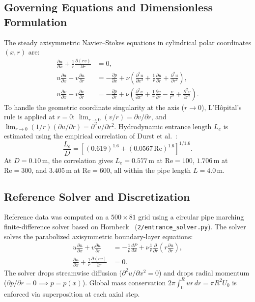 \documentclass[11pt,a4paper]{article}
\begin{document}
\subsection{Governing Equations and Dimensionless Formulation}
The steady axisymmetric Navier--Stokes equations in cylindrical polar coordinates $(x, r)$ are:
\begin{align}
\frac{\partial u}{\partial x} + \frac{1}{r} \frac{\partial (r v)}{\partial r} &= 0, \\
u \frac{\partial u}{\partial x} + v \frac{\partial u}{\partial r} &= -\frac{\partial p}{\partial x} + \nu \left(\frac{\partial^2 u}{\partial x^2} + \frac{1}{r} \frac{\partial u}{\partial r} + \frac{\partial^2 u}{\partial r^2}\right), \\
u \frac{\partial v}{\partial x} + v \frac{\partial v}{\partial r} &= -\frac{\partial p}{\partial r} + \nu \left(\frac{\partial^2 v}{\partial x^2} + \frac{1}{r} \frac{\partial v}{\partial r} - \frac{v}{r^2} + \frac{\partial^2 v}{\partial r^2}\right).
\end{align}
To handle the geometric coordinate singularity at the axis ($r \to 0$), L'H\^opital's rule is applied at $r = 0$: $\lim_{r\to 0} (v/r) = \partial v/\partial r$, and $\lim_{r\to 0} (1/r)(\partial u/\partial r) = \partial^2 u/\partial r^2$.
Hydrodynamic entrance length $L_e$ is estimated using the empirical correlation of Durst et al.~\cite[Eq.~(2a), p.~8]{ray2017}:
\begin{equation}
\frac{L_e}{D} = \left[(0.619)^{1.6} + (0.0567\,\mathrm{Re})^{1.6}\right]^{1/1.6}.
\end{equation}
At $D = 0.10\,\text{m}$, the correlation gives $L_e = 0.577\,\text{m}$ at $\mathrm{Re}=100$, $1.706\,\text{m}$ at $\mathrm{Re}=300$, and $3.405\,\text{m}$ at $\mathrm{Re}=600$, all within the pipe length $L = 4.0\,\text{m}$.

\subsection{Reference Solver and Discretization}
Reference data was computed on a $500 \times 81$ grid using a circular pipe marching finite-difference solver based on Hornbeck~\cite[Ch.~7, pp.~195--202]{hornbeck1973} (\texttt{2/entrance\_solver.py}).
The solver solves the parabolized axisymmetric boundary-layer equations:
\begin{align}
u \frac{\partial u}{\partial x} + v \frac{\partial u}{\partial r} &= -\frac{1}{\rho}\frac{dP}{dx} + \nu \frac{1}{r}\frac{\partial}{\partial r}\left(r \frac{\partial u}{\partial r}\right), \\
\frac{\partial u}{\partial x} + \frac{1}{r}\frac{\partial (r v)}{\partial r} &= 0.
\end{align}
The solver drops streamwise diffusion ($\partial^2 u/\partial x^2 = 0$) and drops radial momentum ($\partial p/\partial r = 0 \implies p = p(x)$). Global mass conservation $2\pi \int_0^R u r\,dr = \pi R^2 U_0$ is enforced via superposition at each axial step.
\end{document}
